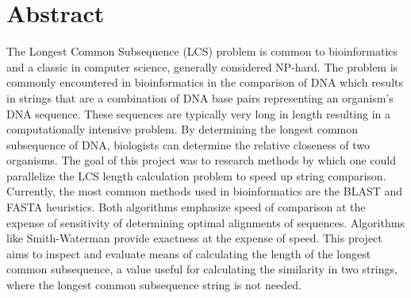 \section{Abstract}

The Longest Common Subsequence (LCS) problem is common to
bioinformatics and a classic in computer science, generally considered
NP-hard.  The problem is commonly encountered in bioinformatics in the
comparison of DNA which results in strings that are a combination of
DNA base pairs representing an organism's DNA sequence. These
sequences are typically very long in length resulting in a
computationally intensive problem. By determining the longest common
subsequence of DNA, biologists can determine the relative closeness of
two organisms. The goal of this project was to research methods by
which one could parallelize the LCS length calculation problem to
speed up string comparison. Currently, the most common methods used in
bioinformatics are the BLAST and FASTA heuristics. Both algorithms
emphasize speed of comparison at the expense of sensitivity of
determining optimal alignments of sequences. Algorithms like
Smith-Waterman provide exactness at the expense of speed. This project
aims to inspect and evaluate means of calculating the length of the
longest common subsequence, a value useful for calculating the
similarity in two strings, where the longest common subsequence string
is not needed.

